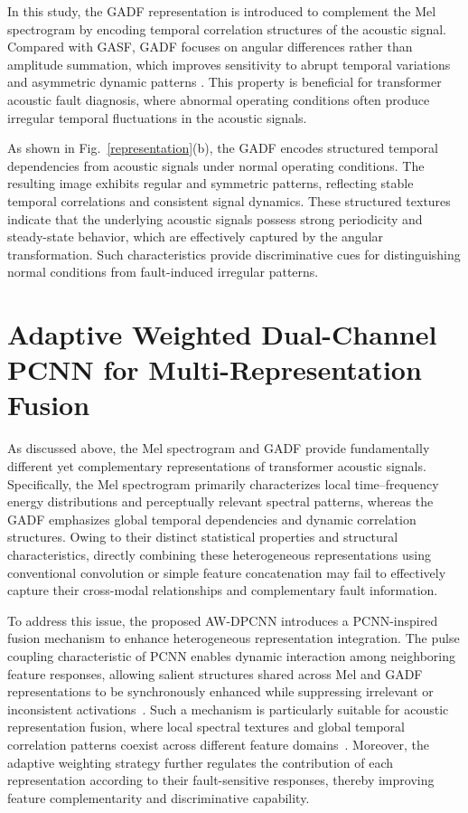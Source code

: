 \documentclass[anonymous]{iopjournal}
\begin{document}
In this study, the GADF representation is introduced to complement the Mel spectrogram by encoding temporal correlation structures of the acoustic signal. Compared with GASF, GADF focuses on angular differences rather than amplitude summation, which improves sensitivity to abrupt temporal variations and asymmetric dynamic patterns \cite{11278186}. This property is beneficial for transformer acoustic fault diagnosis, where abnormal operating conditions often produce irregular temporal fluctuations in the acoustic signals.

As shown in Fig.~\ref{representation}(b), the GADF encodes structured temporal dependencies from acoustic signals under normal operating conditions. The resulting image exhibits regular and symmetric patterns, reflecting stable temporal correlations and consistent signal dynamics. These structured textures indicate that the underlying acoustic signals possess strong periodicity and steady-state behavior, which are effectively captured by the angular transformation. Such characteristics provide discriminative cues for distinguishing normal conditions from fault-induced irregular patterns.

\section{Adaptive Weighted Dual-Channel PCNN for Multi-Representation Fusion}
\label{section3}
As discussed above, the Mel spectrogram and GADF provide fundamentally different yet complementary representations of transformer acoustic signals. Specifically, the Mel spectrogram primarily characterizes local time--frequency energy distributions and perceptually relevant spectral patterns, whereas the GADF emphasizes global temporal dependencies and dynamic correlation structures. Owing to their distinct statistical properties and structural characteristics, directly combining these heterogeneous representations using conventional convolution or simple feature concatenation may fail to effectively capture their cross-modal relationships and complementary fault information.

To address this issue, the proposed AW-DPCNN introduces a PCNN-inspired fusion mechanism to enhance heterogeneous representation integration. The pulse coupling characteristic of PCNN enables dynamic interaction among neighboring feature responses, allowing salient structures shared across Mel and GADF representations to be synchronously enhanced while suppressing irrelevant or inconsistent activations~\cite{Li_2018}. Such a mechanism is particularly suitable for acoustic representation fusion, where local spectral textures and global temporal correlation patterns coexist across different feature domains~\cite{Kang_2021}. Moreover, the adaptive weighting strategy further regulates the contribution of each representation according to their fault-sensitive responses, thereby improving feature complementarity and discriminative capability.
\end{document}
